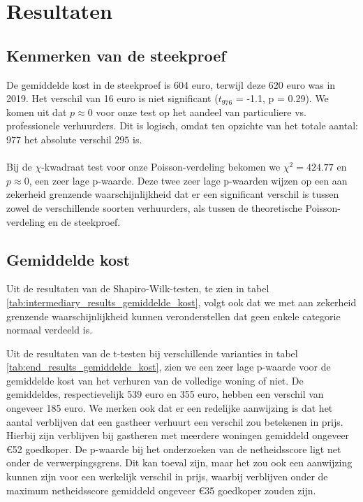 \documentclass[a4paper]{kulakarticle}
\begin{document}
	\section{Resultaten}
	
	\subsection{Kenmerken van de steekproef}
	De gemiddelde kost in de steekproef is 604 euro, terwijl deze  620 euro was in 2019. Het verschil van 16 euro is niet significant ($t_{976}$ = -1.1, p = 0.29). We komen uit dat $p \approx 0$ voor onze test op het aandeel van particuliere vs. professionele verhuurders. Dit is logisch, omdat ten opzichte van het totale aantal: $977$ het absolute verschil $295$ is.\\\\
	Bij de $\chi$-kwadraat test voor onze Poisson-verdeling bekomen we $\chi^2 = 424.77$ en $p \approx 0$, een zeer lage p-waarde. Deze twee zeer lage p-waarden wijzen op een aan zekerheid grenzende waarschijnlijkheid dat er een significant verschil is tussen zowel de verschillende soorten verhuurders, als tussen de theoretische Poisson-verdeling en de steekproef.
	
	\subsection{Gemiddelde kost}
	 Uit de resultaten van de Shapiro-Wilk-testen, te zien in tabel \ref{tab:intermediary_results_gemiddelde_kost}, volgt ook dat we met aan zekerheid grenzende waarschijnlijkheid kunnen veronderstellen dat geen enkele categorie normaal verdeeld is.
	
	Uit de resultaten van de t-testen bij verschillende varianties in tabel \ref{tab:end_results_gemiddelde_kost}, zien we een zeer lage p-waarde voor de gemiddelde kost van het verhuren van de volledige woning of niet. De gemiddeldes, respectievelijk 539 euro en 355 euro, hebben een verschil van ongeveer 185 euro. We merken ook dat er een redelijke aanwijzing is dat het aantal verblijven dat een gastheer verhuurt een verschil zou betekenen in prijs. Hierbij zijn verblijven bij gastheren met meerdere woningen gemiddeld ongeveer €52 goedkoper.
	De p-waarde bij het onderzoeken van de netheidsscore ligt net onder de verwerpingsgrens. Dit kan toeval zijn, maar het zou ook een aanwijzing kunnen zijn voor een werkelijk verschil in prijs, waarbij verblijven onder de maximum netheidsscore gemiddeld ongeveer €35 goedkoper zouden zijn.
	
\end{document}
